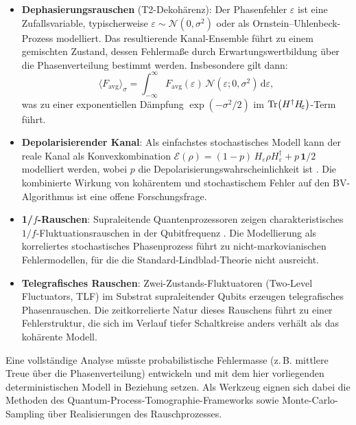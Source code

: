 ﻿\documentclass[11pt,a4paper]{article}
\theoremstyle{definition}
\newcommand{\eps}{\varepsilon}
\newcommand{\Heps}{H_{\!\varepsilon}}
\newcommand{\Fav}{F_{\!\mathrm{avg}}}
\begin{document}
\begin{itemize}
  \item \textbf{Dephasierungsrauschen} (T2-Dekohärenz): Der Phasenfehler $\eps$
        ist eine Zufallsvariable, typischerweise $\eps\sim\mathcal{N}(0,\sigma^2)$
        oder als Ornstein--Uhlenbeck-Prozess modelliert.  Das resultierende
        Kanal-Ensemble führt zu einem gemischten Zustand, dessen Fehlermaße
        durch Erwartungswertbildung über die Phasenverteilung bestimmt werden.
        Insbesondere gilt dann:
        \[
          \langle\Fav\rangle_\sigma = \int_{-\infty}^{\infty}
          \Fav(\eps)\,\mathcal{N}(\eps;0,\sigma^2)\,\mathrm{d}\eps,
        \]
        was zu einer exponentiellen Dämpfung $\exp(-\sigma^2/2)$ im
        $\Tr(H^\dagger\Heps)$-Term führt.

  \item \textbf{Depolarisierender Kanal}: Als einfachstes stochastisches Modell
        kann der reale Kanal als Konvexkombination
        $\mathcal{E}(\rho) = (1-p)\,\Heps\rho\Heps^\dagger + p\,\mathbf{1}/2$
        modelliert werden, wobei $p$ die Depolarisierungswahrscheinlichkeit
        ist \cite{Nielsen2000}.  Die kombinierte Wirkung von kohärentem und
        stochastischem Fehler auf den BV-Algorithmus ist eine offene
        Forschungsfrage.

  \item \textbf{1/$f$-Rauschen}: Supraleitende Quantenprozessoren zeigen
        charakteristisches $1/f$-Fluktua\-tionsrauschen in der Qubitfrequenz
        \cite{Bylander2011}.  Die Modellierung als korreliertes stochastisches
        Phasenprozess führt zu nicht-markovianischen Fehlermodellen, für die
        die Standard-Lindblad-Theorie nicht ausreicht.

  \item \textbf{Telegrafisches Rauschen}: Zwei-Zustands-Fluktuatoren
        (Two-Level Fluctuators, TLF) im Substrat supraleitender Qubits
        erzeugen telegrafisches Phasenrauschen.  Die zeitkorrelierte Natur
        dieses Rauschens führt zu einer Fehlerstruktur, die sich im Verlauf
        tiefer Schaltkreise anders verhält als das kohärente Modell.
\end{itemize}

Eine vollständige Analyse müsste probabilistische Fehlermasse
(z.\,B. mittlere Treue über die Phasenverteilung) entwickeln und mit
dem hier vorliegenden deterministischen Modell in Beziehung setzen.
Als Werkzeug eignen sich dabei die Methoden des
Quantum-Process-Tomographie-Frameworks \cite{Chuang1997} sowie
Monte-Carlo-Sampling über Realisierungen des Rauschprozesses.
\end{document}
